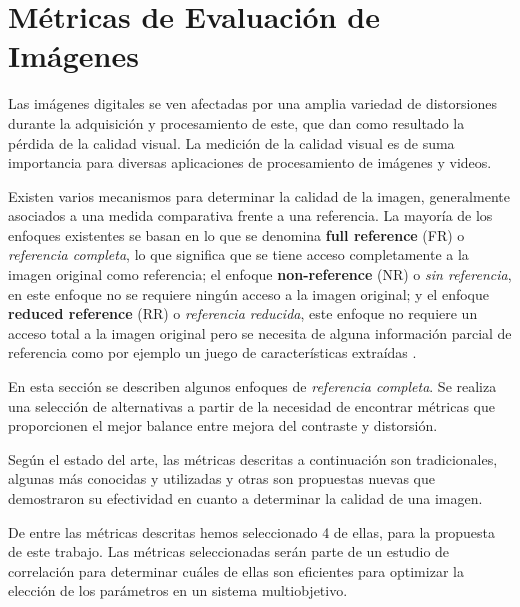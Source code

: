 \chapter{Métricas de Evaluación de Imágenes}
\label{chap4}
\ifpdf
  \graphicspath{{Chapter4/Chapter4Figs/PNG/}{Chapter4/Chapter4Figs/PDF/}{Chapter4/Chapter4Figs/}}
\else
  \graphicspath{{Chapter4/Chapter4Figs/EPS/}{Chapter4/Chapter4Figs/}}
\fi



Las imágenes digitales se ven afectadas por una amplia variedad de distorsiones durante la adquisición y procesamiento de este, que dan como resultado la pérdida de la calidad visual. La medición de la calidad visual es de suma importancia para diversas aplicaciones de procesamiento de imágenes y videos. 
 
Existen varios mecanismos para determinar la calidad de la imagen, generalmente asociados a una medida comparativa frente a una referencia. La mayoría de los enfoques existentes se basan en lo que se denomina \textbf{full reference} (FR) o {\it referencia completa}, lo que significa que se tiene acceso  completamente a la imagen original como referencia; el enfoque \textbf{non-reference} (NR) o {\it sin referencia}, en este enfoque no se requiere ningún acceso a la imagen original; y el enfoque \textbf{reduced reference} (RR) o {\it referencia reducida}, este enfoque no requiere un acceso total a la imagen original pero se necesita de alguna información parcial de referencia como por ejemplo un juego de características extraídas \cite{wang2004}. 

En esta sección se describen algunos enfoques de {\it referencia completa}.
Se realiza una selección de alternativas a partir de la necesidad de encontrar métricas que proporcionen el mejor balance entre mejora del contraste y distorsión.

Según el estado del arte, las métricas descritas a continuación son tradicionales, algunas más conocidas y utilizadas y otras son propuestas nuevas que demostraron su efectividad en cuanto a determinar la calidad de una imagen. 

De entre las métricas descritas hemos seleccionado 4 de ellas, para la propuesta de este trabajo. Las métricas seleccionadas serán parte de un estudio de correlación para determinar cuáles de ellas son eficientes para optimizar la elección de los parámetros en un sistema multiobjetivo.

